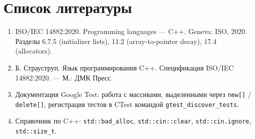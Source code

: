 \section{Список литературы}

\begin{enumerate}
  \item ISO/IEC 14882:2020. Programming languages --- C++. Geneva: ISO, 2020.
        Разделы 6.7.5 (initializer lists), 11.2 (array-to-pointer decay),
        17.4 (allocators).
  \item Б. Страуструп. Язык программирования C++. Спецификация ISO/IEC
        14882:2020. --- М.: ДМК Пресс.
  \item Документация Google Test: работа с массивами, выделенными через
        \texttt{new[]} / \texttt{delete[]}, регистрация тестов в CTest
        командой \texttt{gtest\_discover\allowbreak\_tests}.
  \item Справочник по C++: \texttt{std::bad\_alloc}, \texttt{std::cin::clear},
        \texttt{std::cin.ignore}, \texttt{std::size\_t}.
\end{enumerate}
